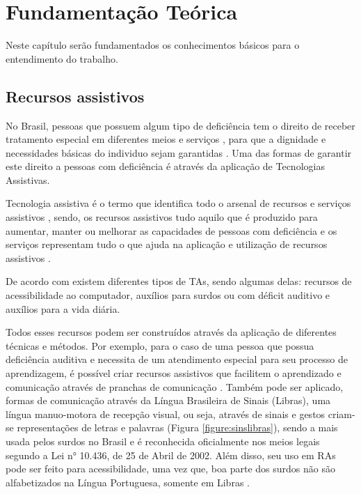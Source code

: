 \chapter{Fundamentação Teórica}
\label{ch:fundamentacao}
\par Neste capítulo ser\~ao fundamentados os conhecimentos b\'asicos para o entendimento do trabalho.

\section{Recursos assistivos}

\par No Brasil, pessoas que possuem algum tipo de deficiência tem o direito de receber tratamento especial em diferentes meios e serviços \cite{ANDRIOLI2017}, para que a dignidade e necessidades básicas do individuo sejam garantidas \cite{DeOliveira2011}. Uma das formas de garantir este direito a pessoas com deficiência é através da aplicação de Tecnologias Assistivas.

\par Tecnologia assistiva é o termo que identifica todo o arsenal de recursos e serviços assistivos \cite{Bersch2017}, sendo, os recursos assistivos tudo aquilo que é produzido para aumentar, manter ou melhorar as capacidades de pessoas com deficiência \cite{tonollijoseberschrita2017} e os serviços representam tudo o que ajuda na aplicação e utilização de recursos assistivos \cite{tonollijoseberschrita2017}.

\par De acordo com  existem diferentes tipos de TAs, sendo algumas delas: recursos de acessibilidade ao computador, auxílios para surdos ou com déficit auditivo e auxílios para a vida diária.

\par Todos esses recursos podem ser construídos através da aplicação de diferentes técnicas e métodos. Por exemplo, para o caso de uma pessoa que possua deficiência auditiva e necessita de um atendimento especial para seu processo de aprendizagem, é possível criar recursos assistivos que facilitem o aprendizado e comunicação através de pranchas de comunicação \cite{Bersch2017}. Também pode ser aplicado, formas de comunicação através da Língua Brasileira de Sinais (Libras), uma língua manuo-motora de recepção visual, ou seja, através de sinais e gestos criam-se representações de letras e palavras (Figura \ref{figure:sinslibras}), sendo a mais usada pelos surdos no Brasil \cite{paulovazdecarvalho2019} e é reconhecida oficialmente nos meios legais segundo a Lei n° 10.436, de 25 de Abril de 2002. Além disso, seu uso em RAs pode ser feito para acessibilidade, uma vez que, boa parte dos surdos não são alfabetizados na Língua Portuguesa, somente em Libras \cite{tve2016}.

